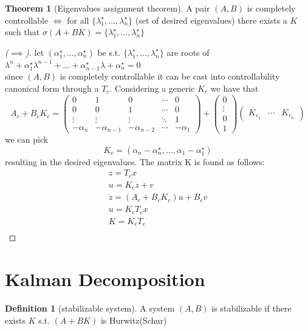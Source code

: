 \documentclass{book}
\theoremstyle{definition}
\newtheorem{definition}{Definition}[section]
\newtheorem{theorem}{Theorem}[section]
\theoremstyle{remark}
\theoremstyle{remark}
\begin{document}
\begin{theorem}[Eigenvalues assignment theorem]
    A pair $(A,B)$ is completely controllable $\iff$ for all \(\{\lambda_1^{\star},\dots,\lambda_n^{\star}\}\) (set of desired eigenvalues) there exists a $K$ such that $\sigma(A+BK)=\{\lambda_1^{\star},\dots,\lambda_n^{\star}\}$
\end{theorem}
\begin{proof}[($\implies$)]
    let $(\alpha_1^{\star},\dots,\alpha_n^{\star})$ be s.t. $\{\lambda_1^{\star},\dots,\lambda_n^{\star}\}$ are roots of $\lambda^n+\alpha_1^{\star}\lambda^{n-1}+\dots+\alpha_{n-1}^{\star}\lambda +\alpha_n^{\star}=0$ \\
    since $(A,B)$ is completely controllable it can be cast into controllability canonical form through a $T_c$. Considering a generic $K_c$ we have that
    \[
    A_c+B_cK_c=\begin{pmatrix}
    0 & 1 & 0 & \cdots & 0 \\
    0 & 0  & 1 & \cdots & 0 \\
    \vdots & \vdots & \vdots & \ddots & 1\\
    -\alpha_n & -\alpha_{n-1} & -\alpha_{n-2}& \cdots & -\alpha_1
\end{pmatrix} +\begin{pmatrix}
    0 \\ \vdots \\ 0 \\1
\end{pmatrix} \begin{pmatrix}
    K_{c_1} & \cdots & K_{c_n}
\end{pmatrix}
    \]
    we can pick
        \[
    K_c=(\alpha_n-\alpha_n^{\star},\dots,\alpha_1-\alpha_1^{\star})
    \]
    resulting in the desired eigenvalues. The matrix K is found as follows:
    \begin{gather*}
        z=T_cx \\
        u=K_cz+v \\
        \dot{z}=(A_c+B_cK_c)u+B_cv \\
        u=K_cT_cx \\
        K=K_cT_c \\
    \end{gather*}
    
\end{proof}

\section{Kalman Decomposition}
\begin{definition}[stabilizable system]
    A system $(A,B)$ is stabilizable if there exists $K$ s.t. $(A+BK)$ is Hurwitz(Schur)
\end{definition}
\end{document}
